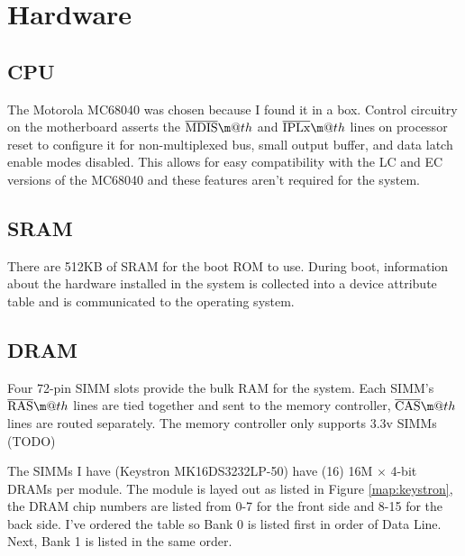 \documentclass{article}
\makeatletter
\newcommand*{\textoverline}[1]{$\overline{\hbox{#1}}\m@th$}
\makeatother
\begin{document}
\section{Hardware}

\subsection{CPU}

The Motorola MC68040 was chosen because I found it in a box. Control circuitry
on the motherboard asserts the \textoverline{MDIS} and \textoverline{IPLx} lines
on processor reset to configure it for non-multiplexed bus, small output buffer,
and data latch enable modes disabled. This allows for easy compatibility with
the LC and EC versions of the MC68040 and these features aren't required for
the system.

\subsection{SRAM}

There are 512KB of SRAM for the boot ROM to use. During boot, information about
the hardware installed in the system is collected into a device attribute table
and is communicated to the operating system.

\subsection{DRAM}

Four 72-pin SIMM slots provide the bulk RAM for the system. Each SIMM's
\textoverline{RAS} lines are tied together and sent to the memory controller,
\textoverline{CAS} lines are routed separately. The memory controller only
supports 3.3v SIMMs (TODO)

The SIMMs I have (Keystron MK16DS3232LP-50) have (16) 16M $\times$ 4-bit DRAMs
per module. The module is layed out as listed in Figure \ref{map:keystron}, the
DRAM chip numbers are listed from 0-7 for the front side and 8-15 for the back
side. I've ordered the table so Bank 0 is listed first in order of Data Line.
Next, Bank 1 is listed in the same order.
\end{document}
